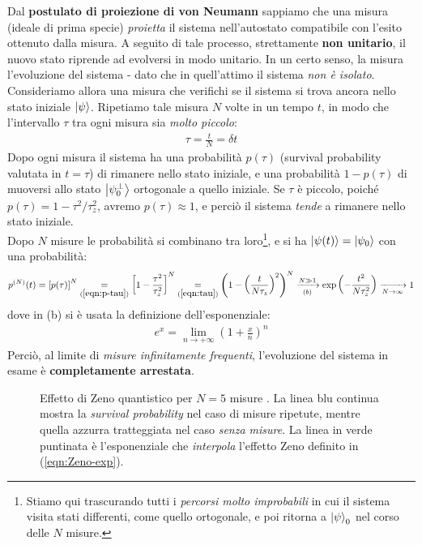 \documentclass[../../InformazioneQuantistica.tex]{subfiles}
\begin{document}
Dal \textbf{postulato di proiezione di von Neumann} sappiamo che una misura (ideale di prima specie) \textit{proietta} il sistema nell'autostato compatibile con l'esito ottenuto dalla misura. A seguito di tale processo, strettamente \textbf{non unitario}, il nuovo stato riprende ad evolversi in modo unitario. In un certo senso, la misura  l'evoluzione del sistema - dato che in quell'attimo il sistema \textit{non è isolato}.\\

Consideriamo allora una misura che verifichi se il sistema si trova ancora nello stato iniziale $\Ket{\psi}$. Ripetiamo tale misura $N$ volte in un tempo $t$, in modo che l'intervallo $\tau$ tra ogni misura sia \textit{molto piccolo}:
\begin{align}
\tau = \frac{t}{N} = \delta t\label{eqn:tau}
\end{align}
Dopo ogni misura il sistema ha una probabilità $p(\tau)$ (survival probability valutata in $t=\tau$) di rimanere nello stato iniziale, e una probabilità $1-p(\tau)$ di muoversi allo stato $\Ket{\psi_0^\perp}$ ortogonale a quello iniziale. Se $\tau$ è piccolo, poiché $p(\tau) = 1-\tau^2/\tau_z^2$, avremo $p(\tau) \approx 1$, e perciò il sistema \textit{tende} a rimanere nello stato iniziale.\\

Dopo $N$ misure le probabilità si combinano tra loro\footnote{Stiamo qui trascurando tutti i \textit{percorsi molto improbabili} in cui il sistema visita stati differenti, come quello ortogonale, e poi ritorna a $\Ket{\psi}_0$ nel corso delle $N$ misure.}, e si ha $\Ket{\psi(t)}=\Ket{\psi_0}$ con una probabilità:
\begin{align*}
p^{(N)}(t) = \left[p(\tau)\right]^N \underset{(\ref{eqn:p-tau})}{=} \left[1-\frac{\tau^2}{\tau_z^2}\right]^N \underset{(\ref{eqn:tau})}{=} \left(1-\left(\frac{t}{N \tau_z}\right)^2\right)^N \xrightarrow[(b)]{N \gg 1} \exp\left(-\frac{t^2}{N\tau_z^2}\right) \xrightarrow[{N\to\infty}]{}1
\end{align*}
dove in (b) si è usata la definizione dell'esponenziale:
\begin{align*}
e^x = \lim_{n\to+\infty} \left(1+\frac{x}{n}\right)^n
\end{align*}
Perciò, al limite di \textit{misure infinitamente frequenti}, l'evoluzione del sistema in esame è \textbf{completamente arrestata}.

\begin{figure}[H]
\centering

\caption{Effetto di Zeno quantistico per $N=5$ misure . La linea blu continua mostra la \textit{survival probability} nel caso di misure ripetute, mentre quella azzurra tratteggiata nel caso \textit{senza misure}. La linea in verde puntinata è l'esponenziale che \textit{interpola} l'effetto Zeno definito in (\ref{eqn:Zeno-exp}).\label{fig:effetto-Zeno}}
\end{figure}
\end{document}
